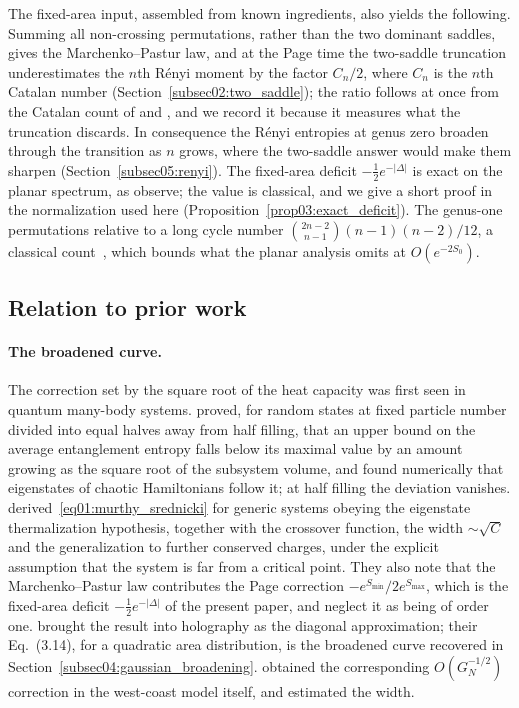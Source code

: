 \documentclass[11pt,letterpaper]{article}
\theoremstyle{plain}
\theoremstyle{definition}
\theoremstyle{remark}
\begin{document}
The fixed-area input, assembled from known ingredients, also yields the following. Summing all non-crossing permutations, rather than the two dominant saddles, gives the Marchenko--Pastur law, and at the Page time the two-saddle truncation underestimates the $n$th R\'enyi moment by the factor $C_n/2$, where $C_n$ is the $n$th Catalan number (Section~\ref{subsec02:two_saddle}); the ratio follows at once from the Catalan count of \citet{pssyetal2022} and \citet{marolfwangwang2020}, and we record it because it measures what the truncation discards. In consequence the R\'enyi entropies at genus zero broaden through the transition as $n$ grows, where the two-saddle answer would make them sharpen (Section~\ref{subsec05:renyi}). The fixed-area deficit $-\tfrac12 e^{-|\Delta|}$ is exact on the planar spectrum, as \citet{pssyetal2022} observe; the value is classical, and we give a short proof in the normalization used here (Proposition~\ref{prop03:exact_deficit}). The genus-one permutations relative to a long cycle number $\binom{2n-2}{n-1}(n-1)(n-2)/12$, a classical count~\citep{goupilschaeffer1998}, which bounds what the planar analysis omits at $O(e^{-2S_0})$.

\subsection{Relation to prior work}
\label{subsec01:prior_work}

\paragraph{The broadened curve.} The correction set by the square root of the heat capacity was first seen in quantum many-body systems. \citet{vidmarrigol2017} proved, for random states at fixed particle number divided into equal halves away from half filling, that an upper bound on the average entanglement entropy falls below its maximal value by an amount growing as the square root of the subsystem volume, and found numerically that eigenstates of chaotic Hamiltonians follow it; at half filling the deviation vanishes. \citet{murthysrednicki2019} derived~\eqref{eq01:murthy_srednicki} for generic systems obeying the eigenstate thermalization hypothesis, together with the crossover function, the width $\sim\sqrt{C}$ and the generalization to further conserved charges, under the explicit assumption that the system is far from a critical point. They also note that the Marchenko--Pastur law contributes the Page correction $-e^{S_{\min}}/2e^{S_{\max}}$, which is the fixed-area deficit $-\tfrac12 e^{-|\Delta|}$ of the present paper, and neglect it as being of order one. \citet{marolfwangwang2020} brought the result into holography as the diagonal approximation; their Eq.~(3.14), for a quadratic area distribution, is the broadened curve recovered in Section~\ref{subsec04:gaussian_broadening}. \citet{pssyetal2022} obtained the corresponding $O(G_N^{-1/2})$ correction in the west-coast model itself, and \citet{penington2020} estimated the width.
\end{document}
